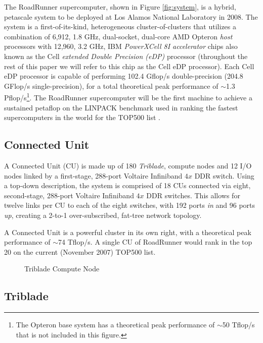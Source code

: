 \documentclass[letter,10pt]{article}
\begin{document}
The RoadRunner supercomputer, shown in Figure \ref{fig:system},
is a hybrid, petascale system to be deployed at Los Alamos National
Laboratory in 2008.  The system is a first-of-its-kind, heterogeneous
cluster-of-clusters that utilizes a combination of 6,912, 1.8 GHz,
dual-socket, dual-core AMD Opteron \emph{host} processors with 12,960,
3.2 GHz, IBM \emph{PowerXCell 8I accelerator} chips also known as the
Cell \emph{extended Double Precision (eDP)} processor (throughout the
rest of this paper we will refer to this chip as the Cell eDP processor).
Each Cell eDP processor is capable of performing 102.4 Gflop/s
double-precision (204.8 GFlop/s single-precision), for a total
theoretical peak performance of $\sim$1.3 Pflop/s\footnote{The Opteron
base system has a theoretical peak performance of $\sim$50 Tflop/s that
is not included in this figure.}.
The RoadRunner supercomputer will be the first machine to achieve a
sustained petaflop on the LINPACK benchmark used in ranking the
fastest supercomputers in the world for the TOP500 list \cite{top500}.

\subsection*{Connected Unit}

A Connected Unit (CU) is made up of 180 \emph{Triblade}, compute
nodes and 12 I/O nodes linked by a first-stage, 288-port Voltaire
Infiniband $4x$ DDR switch.  Using a top-down description, the
system is comprised of 18 CUs connected via eight, second-stage,
288-port Voltaire Infiniband $4x$ DDR switches.  This allows for
twelve links per CU to each of the eight switches, with 192 ports
\emph{in} and 96 ports \emph{up}, creating a 2-to-1 over-subscribed,
fat-tree network topology.

A Connected Unit is a powerful cluster in 
its own right, with a theoretical peak performance of
$\sim$74 Tflop/s.  A single CU of RoadRunner would rank in the
top 20 on the current (November 2007) TOP500 list.

\begin{figure}
    \begin{center}
    \scalebox{0.2}{}
    \caption{Triblade Compute Node}
    \label{fig:triblade}
    \end{center}
\end{figure}

\subsection*{Triblade}
\end{document}
